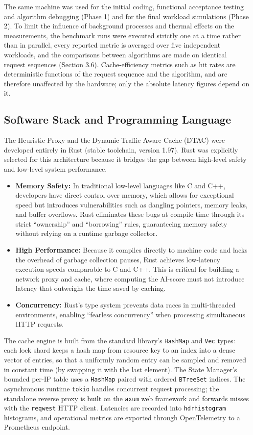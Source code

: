 The same machine was used for the initial coding, functional acceptance testing and algorithm debugging (Phase 1) and for the final workload simulations (Phase 2). To limit the influence of background processes and thermal effects on the measurements, the benchmark runs were executed strictly one at a time rather than in parallel, every reported metric is averaged over five independent workloads, and the comparisons between algorithms are made on identical request sequences (Section 3.6). Cache-efficiency metrics such as hit rates are deterministic functions of the request sequence and the algorithm, and are therefore unaffected by the hardware; only the absolute latency figures depend on it.

\subsection{Software Stack and Programming Language}
The Heuristic Proxy and the Dynamic Traffic-Aware Cache (DTAC) were developed entirely in Rust (stable toolchain, version 1.97). Rust was explicitly selected for this architecture because it bridges the gap between high-level safety and low-level system performance.

\begin{itemize}
    \item \textbf{Memory Safety:} In traditional low-level languages like C and C++, developers have direct control over memory, which allows for exceptional speed but introduces vulnerabilities such as dangling pointers, memory leaks, and buffer overflows. Rust eliminates these bugs at compile time through its strict ``ownership'' and ``borrowing'' rules, guaranteeing memory safety without relying on a runtime garbage collector.
    \item \textbf{High Performance:} Because it compiles directly to machine code and lacks the overhead of garbage collection pauses, Rust achieves low-latency execution speeds comparable to C and C++. This is critical for building a network proxy and cache, where computing the AI-score must not introduce latency that outweighs the time saved by caching.
    \item \textbf{Concurrency:} Rust's type system prevents data races in multi-threaded environments, enabling ``fearless concurrency'' when processing simultaneous HTTP requests.
\end{itemize}

The cache engine is built from the standard library's \texttt{HashMap} and \texttt{Vec} types: each lock shard keeps a hash map from resource key to an index into a dense vector of entries, so that a uniformly random entry can be sampled and removed in constant time (by swapping it with the last element). The State Manager's bounded per-IP table uses a \texttt{HashMap} paired with ordered \texttt{BTreeSet} indices. The asynchronous runtime \texttt{tokio} handles concurrent request processing; the standalone reverse proxy is built on the \texttt{axum} web framework and forwards misses with the \texttt{reqwest} HTTP client. Latencies are recorded into \texttt{hdrhistogram} histograms, and operational metrics are exported through OpenTelemetry to a Prometheus endpoint.

